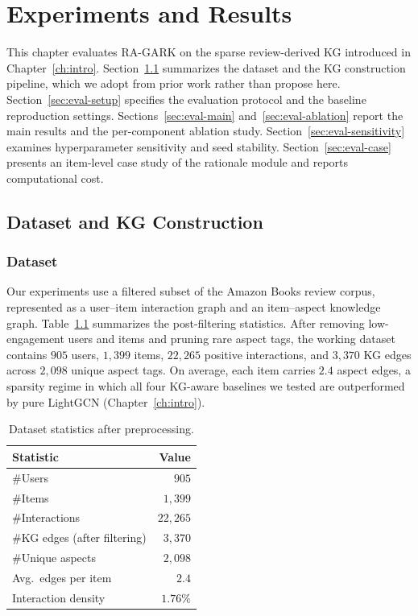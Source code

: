 \chapter{Experiments and Results}
\label{ch:experiments}
\label{ch:evaluation}

\setlength{\tabcolsep}{8pt}

This chapter evaluates RA-GARK on the sparse review-derived KG introduced in Chapter~\ref{ch:intro}. Section~\ref{sec:eval-dataset} summarizes the dataset and the KG construction pipeline, which we adopt from prior work rather than propose here. Section~\ref{sec:eval-setup} specifies the evaluation protocol and the baseline reproduction settings. Sections~\ref{sec:eval-main} and~\ref{sec:eval-ablation} report the main results and the per-component ablation study. Section~\ref{sec:eval-sensitivity} examines hyperparameter sensitivity and seed stability. Section~\ref{sec:eval-case} presents an item-level case study of the rationale module and reports computational cost.

\section{Dataset and KG Construction}
\label{sec:eval-dataset}

\subsection{Dataset}
\label{sec:eval-dataset-stats}

Our experiments use a filtered subset of the Amazon Books review corpus, represented as a user--item interaction graph and an item--aspect knowledge graph. Table~\ref{tab:dataset-stats} summarizes the post-filtering statistics. After removing low-engagement users and items and pruning rare aspect tags, the working dataset contains $905$ users, $1{,}399$ items, $22{,}265$ positive interactions, and $3{,}370$ KG edges across $2{,}098$ unique aspect tags. On average, each item carries $2.4$ aspect edges, a sparsity regime in which all four KG-aware baselines we tested are outperformed by pure LightGCN (Chapter~\ref{ch:intro}).

\begin{table}[H]
\centering
\caption{Dataset statistics after preprocessing.}
\label{tab:dataset-stats}
\begin{tabular}{lr}
\toprule
Statistic & Value \\
\midrule
\#Users                            & $905$ \\
\#Items                            & $1{,}399$ \\
\#Interactions                     & $22{,}265$ \\
\#KG edges (after filtering)       & $3{,}370$ \\
\#Unique aspects                   & $2{,}098$ \\
Avg.\ edges per item               & $2.4$ \\
Interaction density                & $1.76\%$ \\
\bottomrule
\end{tabular}
\end{table}
\FloatBarrier

